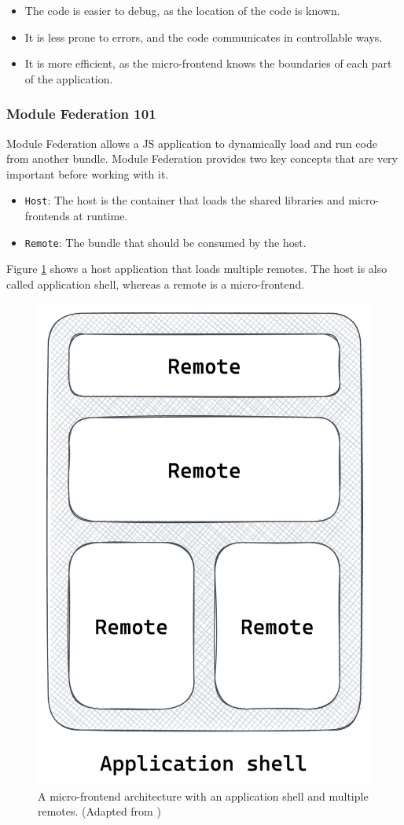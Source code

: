 \begin{itemize}
  \item The code is easier to debug, as the location of the code is known.
  \item It is less prone to errors, and the code communicates in controllable ways.
  \item It is more efficient, as the micro-frontend knows the boundaries of each part of the application.
\end{itemize}

\subsubsection{Module Federation 101}\label{subsubsection:background:micro-frontend:module-federation:101}

Module Federation allows a \ac{JS} application to dynamically load and run code from another bundle. Module Federation provides two key concepts that are very important before working with it. \cite[118-119]{book:2021:mezzalira:applied-methods:building-micro-frontends}

\begin{itemize}
    \item \texttt{Host}: The host is the container that loads the shared libraries and micro-frontends at runtime.
    \item \texttt{Remote}: The bundle that should be consumed by the host.
\end{itemize}

\noindent Figure \ref{fig:background:micro-frontend:module-federation:module-federation-architecture} shows a host application that loads multiple remotes. The host is also called application shell, whereas a remote is a micro-frontend.

\ifshowImages
\begin{figure}[H]
  \centering
  \includegraphics[width=0.25\linewidth]{images/background/micro-frontends/module-federation/module-federation-architecture.png}
  \caption{A micro-frontend architecture with an application shell and multiple remotes. (Adapted from \cite[119]{book:2021:mezzalira:applied-methods:building-micro-frontends})}\label{fig:background:micro-frontend:module-federation:module-federation-architecture}
\end{figure}
\fi

